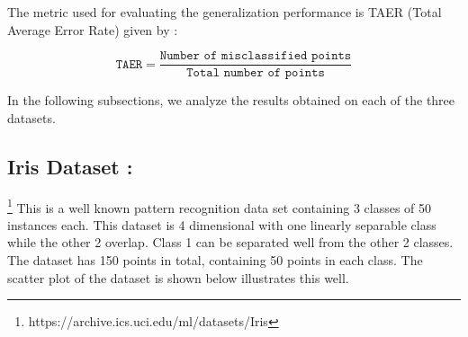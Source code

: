 \documentclass{article} %
\begin{document}
The metric used for evaluating the generalization performance is  TAER (Total Average Error Rate) given by :

\[ \texttt{TAER} = \frac{\texttt{Number of misclassified points}}{\texttt{Total number of points}} \]

In the following subsections, we analyze the results obtained on each of the three datasets.


\subsection{Iris Dataset :} \footnote{https://archive.ics.uci.edu/ml/datasets/Iris}
This is a well known pattern recognition data set containing 3 classes of 50 instances each. This dataset is 4 dimensional with one linearly separable class while the other 2 overlap. Class 1 can be separated well from the other 2 classes. The dataset has 150 points in total, containing 50 points in each class.
The scatter plot of the dataset is shown below illustrates this well.
\end{document}
